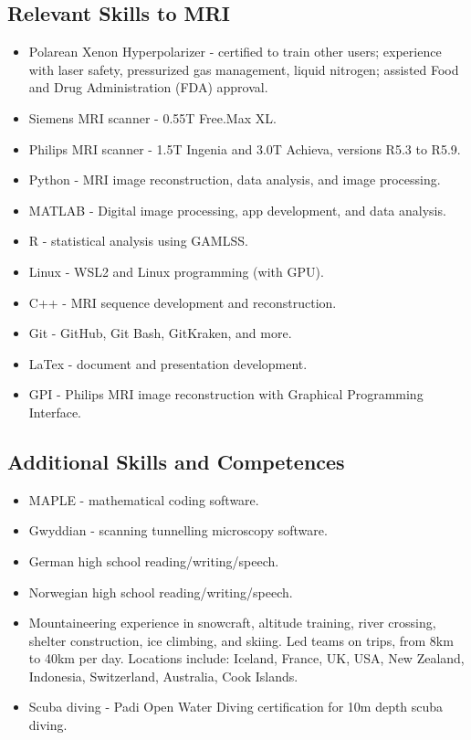 \documentclass[12pt,]{scrartcl}
\begin{document}
\subsection{Relevant Skills to MRI}\label{relevant-skills}
\begin{itemize}
\leftskip -0.25in
    \item Polarean Xenon Hyperpolarizer - certified to train other users; experience with laser safety, pressurized gas management, liquid nitrogen; assisted Food and Drug Administration (FDA) approval.
    \item Siemens MRI scanner - 0.55T Free.Max XL.
    \item Philips MRI scanner - 1.5T Ingenia and 3.0T Achieva, versions R5.3 to R5.9.
    \item Python - MRI image reconstruction, data analysis, and image processing.
    \item MATLAB - Digital image processing, app development, and data analysis.
    \item R - statistical analysis using GAMLSS.
    \item Linux - WSL2 and Linux programming (with GPU).
    \item C++ - MRI sequence development and reconstruction.
    \item Git - GitHub, Git Bash, GitKraken, and more.
    \item LaTex - document and presentation development.
    \item GPI - Philips MRI image reconstruction with Graphical Programming Interface.

\end{itemize}

\subsection{Additional Skills and Competences}\label{additional-skills-competences}
\begin{itemize}
  \leftskip-0.25in
    \item MAPLE - mathematical coding software.
    \item Gwyddian - scanning tunnelling microscopy software.
    \item German high school reading/writing/speech. 
    \item Norwegian high school reading/writing/speech. 
    \item Mountaineering experience in snowcraft, altitude training, river crossing, shelter construction, ice climbing, and skiing. Led teams on trips, from 8km to 40km per day. Locations include: Iceland, France, UK, USA, New Zealand, Indonesia, Switzerland, Australia, Cook Islands.
    \item Scuba diving - Padi Open Water Diving certification for 10m depth scuba diving. 

\end{itemize}
\end{document}
